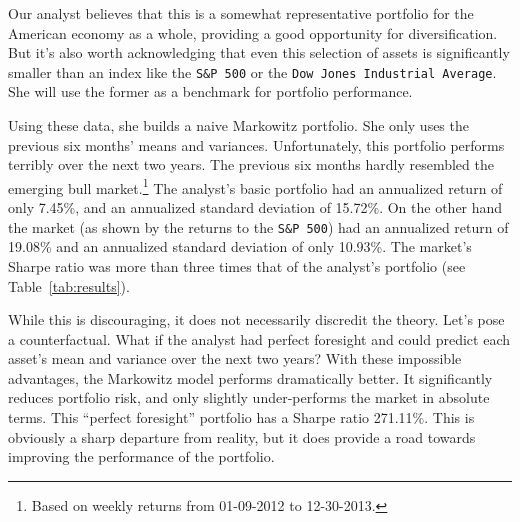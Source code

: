 \documentclass[a4paper]{article}\usepackage[]{graphicx}\usepackage[]{color}
\begin{document}
\begin{table}
    \centering
\caption{Expected returns, standard deviations and Sharpe ratios for the candidate assets for the various portfolios to be shown below.}
    \label{tab:returns}
\end{table}

Our analyst believes that this is a somewhat representative portfolio for the American economy as a whole, providing a good opportunity for diversification. But it's also worth acknowledging that even this selection of assets is significantly smaller than an index like the \texttt{S\&P 500} or the \texttt{Dow Jones Industrial Average}. She will use the former as a benchmark for portfolio performance.

Using these data, she builds a naive Markowitz portfolio. She only uses the previous six months' means and variances. Unfortunately, this portfolio performs terribly over the next two years. The previous six months hardly resembled the emerging bull market.\footnote{Based on weekly returns from 01-09-2012 to 12-30-2013.} The analyst's basic portfolio had an annualized return of only 7.45\%, and an annualized standard deviation of 15.72\%. On the other hand the market (as shown by the returns to the \texttt{S\&P 500}) had an annualized return of 19.08\% and an annualized standard deviation of only 10.93\%. The market's Sharpe ratio was more than three times that of the analyst's portfolio (see Table~\ref{tab:results}).

While this is discouraging, it does not necessarily discredit the theory. Let's pose a counterfactual. What if the analyst had perfect foresight and could predict each asset's mean and variance over the next two years? With these impossible advantages, the Markowitz model performs dramatically better. It significantly reduces portfolio risk, and only slightly under-performs the market in absolute terms. This ``perfect foresight'' portfolio has a Sharpe ratio 271.11\%. This is obviously a sharp departure from reality, but it does provide a road towards improving the performance of the portfolio. 
\end{document}
